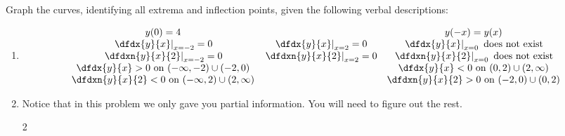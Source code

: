 \begin{ProblemSection}
  \begin{embeddedproblem}{}
    Graph the curves, identifying all extrema and inflection points,
    given the following verbal descriptions:
      \begin{enumerate}[label={\bf{}(\alph*)}]
      \item
        $$
        \begin{array}{ccc}
           y(0)=4&& y(-x)=y(x)\\
          \left.\dfdx{y}{x}\right|_{x=-2}=0&
          \left.\dfdx{y}{x}\right|_{x= 2}=0&
          \left.\dfdx{y}{x}\right|_{x= 0} \text{ does not exist} \\
     \left.\dfdxn{y}{x}{2}\right|_{x=-2}=0&
     \left.\dfdxn{y}{x}{2}\right|_{x=2}=0&
     \left.\dfdxn{y}{x}{2}\right|_{x=0} \text{ does not exist} \\
     \dfdx{y}{x}>0 \text{ on } (-\infty,-2)\cup(-2,0)&&
     \dfdx{y}{x}<0 \text{ on } (0,2)\cup(2,\infty)\\
     \dfdxn{y}{x}{2}<0 \text{ on }(-\infty,2)\cup(2,\infty)&&
      \dfdxn{y}{x}{2}>0 \text{ on } (-2,0)\cup(0,2)\\
        \end{array}
        $$
        \item           Notice that in this problem we only gave you partial
          information. You will need to figure out the rest.
          \begin{multicols}{2}

\end{multicols}
\end{enumerate}
\end{embeddedproblem}
\end{ProblemSection}

